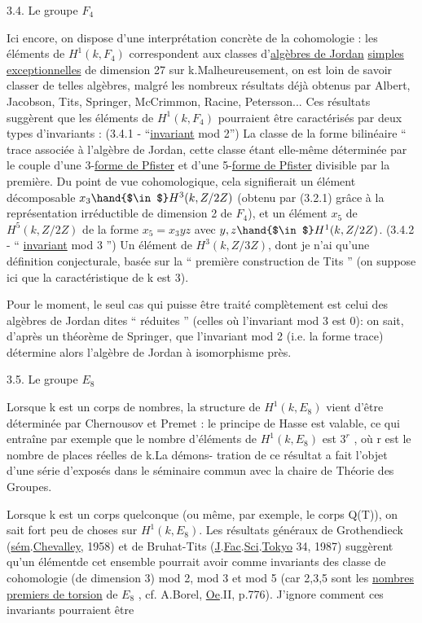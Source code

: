 
3.4. Le groupe $F_4$

Ici encore, on dispose d'une interprétation concrète de la cohomologie :
les éléments de $H^1(k, F_4)$ correspondent aux classes d'\uline{algèbres de Jordan}
\uline{simples exceptionnelles} de dimension 27 sur k.Malheureusement, on
est loin de savoir classer de telles algèbres, malgré les nombreux
résultats déjà obtenus par Albert, Jacobson, Tits, Springer, McCrimmon,
Racine, Petersson... Ces résultats suggèrent que les éléments de
$H^1(k, F_4)$ pourraient être caractérisés par deux types d'invariants :
(3.4.1 - ``\uline{invariant} mod 2'') La classe de la forme bilinéaire `` trace 
associée à l'algèbre de Jordan, cette classe étant elle-même déterminée
par le couple d'une 3-\uline{forme de Pfister} et d'une 5-\uline{forme de Pfister} divisible
par la première. Du point de vue cohomologique, cela signifierait un
élément décomposable $x_3 \hand{$\in$} H^3(k, Z/2Z)$ (obtenu par (3.2.1) grâce à la
représentation irréductible \hand{$\rho$} de dimension 2 de $F_4$), et un élément
$x_5$ de $H^5(k, Z/2Z)$ de la forme $x_5 = x_3yz$ avec $y,z \hand{$\in$} H^1(k, Z/2Z)$.
(3.4.2 - `` \uline{invariant} mod 3 '') Un élément de $H^3(k, Z/3Z)$, dont je n'ai
qu'une définition conjecturale, basée sur la `` première construction
de Tits '' (on suppose ici que la caractéristique de k est \hand{$\neq$} 3).

Pour le moment, le seul cas qui puisse être traité complètement est
celui des algèbres de Jordan dites `` réduites '' (celles où l'invariant
mod 3 est 0): on sait, d'après un théorème de Springer, que l'invariant
mod 2 (i.e. la forme trace) détermine alors l'algèbre de Jordan à isomorphisme
près.

3.5. Le groupe $E_8$

Lorsque k est un corps de nombres, la structure de $H^1(k, E_8)$ vient
d'être déterminée par Chernousov et Premet : le principe de Hasse est
valable, ce qui entraîne par exemple que le nombre d'éléments de
$H^1(k, E_8)$ est $3^r$ , où r est le nombre de places réelles de k.La démons-%
tration de ce résultat a fait l'objet d'une série d'exposés dans le séminaire
commun avec la chaire de Théorie des Groupes.

Lorsque k est un corps quelconque (ou même, par exemple, le corps
Q(T)), on sait fort peu de choses sur $H^1(k, E_8)$. Les résultats généraux de
Grothendieck (\uline{sém}.\uline{Chevalley}, 1958) et de Bruhat-Tits (\uline{J}.\uline{Fac}.\uline{Sci}.\uline{Tokyo}
34, 1987) suggèrent qu'un élément\hand{|}de cet ensemble pourrait avoir comme
invariants des classe de cohomologie (de dimension \hand{$\geqslant$} 3) mod 2, mod 3
et mod 5 (car 2,3,5 sont les \uline{nombres premiers de torsion} de $E_8$ ,
cf. A.Borel, \uline{Oe}.II, p.776). J'ignore comment ces invariants pourraient être

